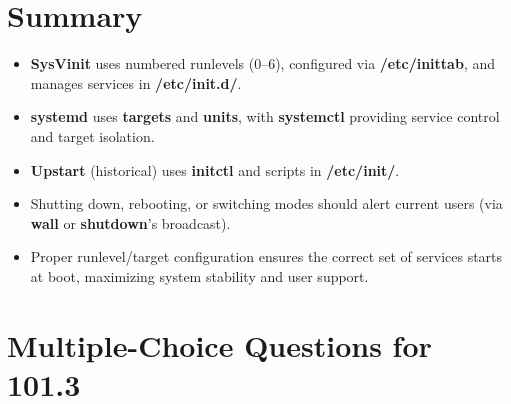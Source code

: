 \documentclass[a4paper]{report}
\begin{document}
\section*{Summary}
\begin{itemize}
    \item \textbf{SysVinit} uses numbered runlevels (0–6), configured via \textbf{/etc/inittab}, and manages services in \textbf{/etc/init.d/}.
    \item \textbf{systemd} uses \textbf{targets} and \textbf{units}, with \textbf{systemctl} providing service control and target isolation.
    \item \textbf{Upstart} (historical) uses \textbf{initctl} and scripts in \textbf{/etc/init/}.
    \item Shutting down, rebooting, or switching modes should alert current users (via \textbf{wall} or \textbf{shutdown}’s broadcast).
    \item Proper runlevel/target configuration ensures the correct set of services starts at boot, maximizing system stability and user support.
\end{itemize}


\newpage
\section*{Multiple-Choice Questions for 101.3}
\end{document}
